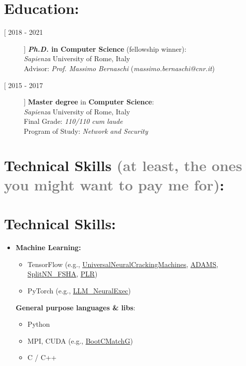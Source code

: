 \documentclass[margin, 10pt]{article} %
\begin{document}
\section*{Education:} 

\begin{description}
\item[[ 2018 - 2021]] \textbf{\textit{Ph.D.}  in  Computer Science} (fellowship winner):\\
\textit{Sapienza} University of Rome, Italy\\
Advisor: \textit{Prof. Massimo Bernaschi} (\textit{massimo.bernaschi@cnr.it})\\


\item[[ 2015 - 2017]] \textbf{Master degree} in  \textbf{Computer Science}: \\
\textit{Sapienza} University of Rome, Italy\\
Final Grade: \textit{110/110} \textit{cum laude}\\
Program of Study: \textit{Network and Security}

\end{description}


\noindent\makebox[\linewidth]{\rule{.2\paperwidth}{0.3pt}}


\ifita
\section*{Technical Skills  \small{\textcolor{gray}{(at least, the ones you might want to pay me for)}}:}
\else
\section*{Technical Skills:}
\fi 
\begin{itemize}
	\item  \textbf{Machine Learning:} 
	\begin{itemize}
		\item TensorFlow (e.g., \href{https://github.com/TheAdamProject/UniversalNeuralCrackingMachines}{UniversalNeuralCrackingMachines}, \href{https://github.com/TheAdamProject/adams}{ADAMS}, \href{https://github.com/pasquini-dario/SplitNN_FSHA}{SplitNN\_FSHA}, \href{https://github.com/pasquini-dario/PLR}{PLR})
		\item PyTorch (e.g., \href{https://github.com/pasquini-dario/LLM_NeuralExec}{LLM\_NeuralExec})
	\end{itemize}
	
	\textbf{General purpose languages \& libs}:
	\begin{itemize}
		\item Python
		\item MPI, CUDA (e.g., \href{https://github.com/bootcmatch/BootCMatchG/}{BootCMatchG})
		\item  C / C++
	\end{itemize}
	
\end{itemize}
\end{document}

